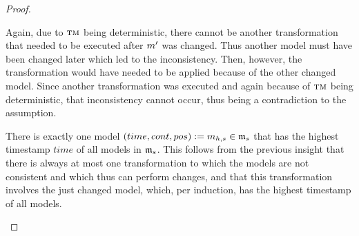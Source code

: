 \begin{proof}
\begin{longenumerate}
            Again, due to $\textsc{tm}$ being deterministic, there cannot be another transformation that needed to be executed after $m_{}'$ was changed. Thus another model must have been changed later which led to the inconsistency. Then, however, the transformation would have needed to be applied because of the other changed model.
            Since another transformation was executed and again because of $\textsc{tm}$ being deterministic, that inconsistency cannot occur, thus being a contradiction to the assumption.
        \item 
            There is exactly one model $(time,cont,pos) := m_{h,s} \in \mathfrak{m}_{s}$ that has the highest timestamp $time$ of all models in $\mathfrak{m}_{s}$.
            This follows from the previous insight that there is always at most one transformation to which the models are not consistent and which thus can perform changes, and that this transformation involves the just changed model, which, per induction, has the highest timestamp of all models.

\end{longenumerate}
\end{proof}
